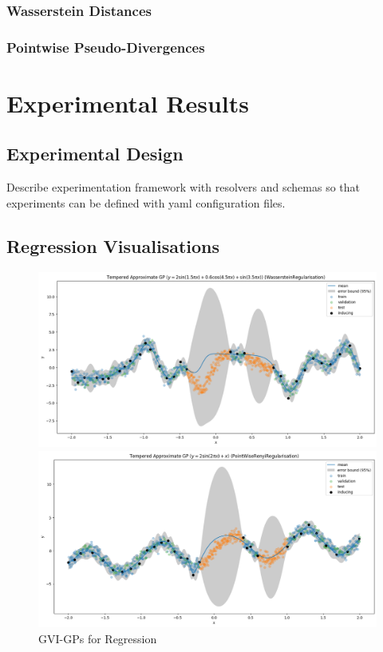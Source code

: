 \documentclass{article}
\numberwithin{equation}{section}
\begin{document}
\subsubsection{Wasserstein Distances}
\subsubsection{Pointwise Pseudo-Divergences}

\newpage
\section{Experimental Results}
\subsection{Experimental Design}
Describe experimentation framework with resolvers and schemas so that experiments can be defined with yaml configuration files.
\subsection{Regression Visualisations}
\begin{figure}[h!]
\centering
\begin{minipage}{.5\textwidth}
  \centering
  \includegraphics[width=0.9\linewidth]{experiments/regression/toy_curves/outputs/curve3/tempered-WassersteinRegularisation.png}
\end{minipage}%
\begin{minipage}{.5\textwidth}
  \centering
  \includegraphics[width=0.9\linewidth]{experiments/regression/toy_curves/outputs/curve4/tempered-PointWiseRenyiRegularisation.png}
\end{minipage}
\caption{GVI-GPs for Regression}
\end{figure}
\end{document}
